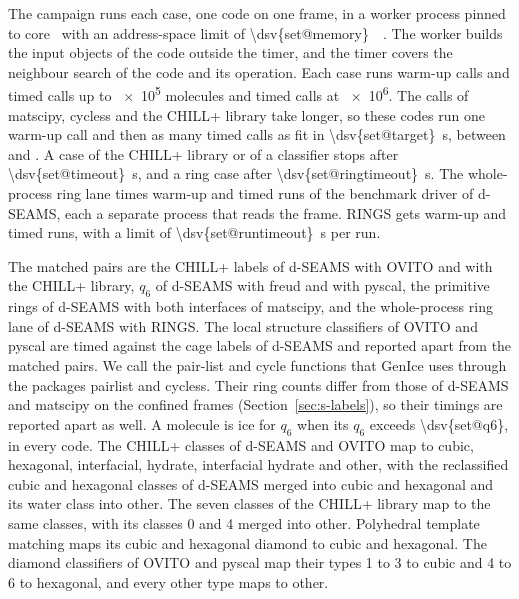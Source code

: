 \documentclass[preprint,12pt]{elsarticle}
\begin{document}
The campaign runs each case, one code on one frame, in a worker process pinned to core~ with an address-space limit of \qty{\dsv{set@memory}}{\gibi\byte}.
The worker builds the input objects of the code outside the timer, and the timer covers the neighbour search of the code and its operation.
Each case runs  warm-up calls and  timed calls up to \num{e5} molecules and  timed calls at \num{e6}.
The calls of matscipy, cycless and the CHILL+ library take longer, so these codes run one warm-up call and then as many timed calls as fit in \qty{\dsv{set@target}}{\second}, between  and .
A case of the CHILL+ library or of a classifier stops after \qty{\dsv{set@timeout}}{\second}, and a ring case after \qty{\dsv{set@ringtimeout}}{\second}.
The whole-process ring lane times  warm-up and  timed runs of the benchmark driver of d-SEAMS, each a separate process that reads the frame.
RINGS gets  warm-up and  timed runs, with a limit of \qty{\dsv{set@runtimeout}}{\second} per run.

The matched pairs are the CHILL+ labels of d-SEAMS with OVITO and with the CHILL+ library, $q_6$ of d-SEAMS with freud and with pyscal, the primitive rings of d-SEAMS with both interfaces of matscipy, and the whole-process ring lane of d-SEAMS with RINGS.
The local structure classifiers of OVITO and pyscal are timed against the cage labels of d-SEAMS and reported apart from the matched pairs.
We call the pair-list and cycle functions that GenIce uses through the packages pairlist and cycless.
Their ring counts differ from those of d-SEAMS and matscipy on the confined frames (Section~\ref{sec:s-labels}), so their timings are reported apart as well.
A molecule is ice for $q_6$ when its $q_6$ exceeds \num{\dsv{set@q6}}, in every code.
The CHILL+ classes of d-SEAMS and OVITO map to cubic, hexagonal, interfacial, hydrate, interfacial hydrate and other, with the reclassified cubic and hexagonal classes of d-SEAMS merged into cubic and hexagonal and its water class into other.
The seven classes of the CHILL+ library map to the same classes, with its classes 0 and 4 merged into other.
Polyhedral template matching maps its cubic and hexagonal diamond to cubic and hexagonal.
The diamond classifiers of OVITO and pyscal map their types 1 to 3 to cubic and 4 to 6 to hexagonal, and every other type maps to other.
\end{document}
